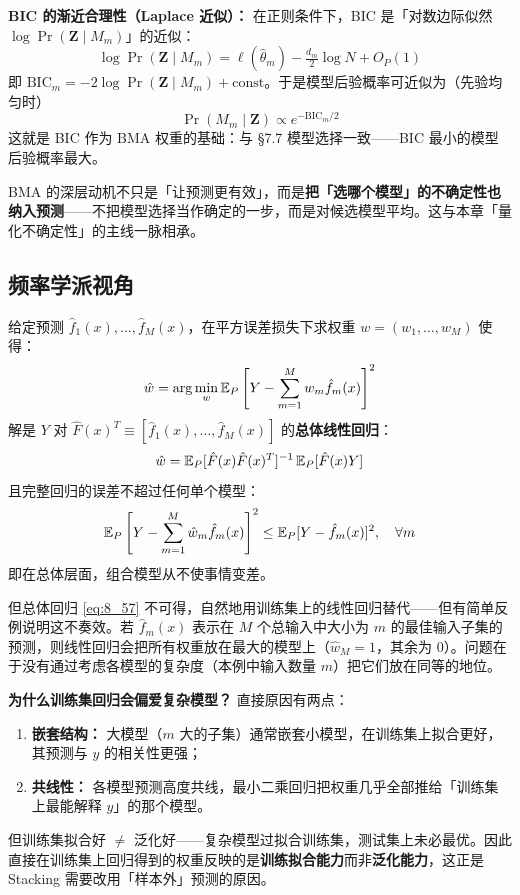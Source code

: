 \textbf{BIC 的渐近合理性（Laplace 近似）：} 在正则条件下，BIC 是「对数边际似然 $\log\Pr(\mathbf{Z}\mid M_m)$」的近似：
\[
    \log\Pr(\mathbf{Z}\mid M_m) = \ell(\hat{\theta}_m) - \tfrac{d_m}{2}\log N + O_P(1)
\]
即 $\mathrm{BIC}_m = -2\log\Pr(\mathbf{Z}\mid M_m) + \text{const}$。于是模型后验概率可近似为（先验均匀时）
\[
    \Pr(M_m\mid\mathbf{Z}) \propto e^{-\mathrm{BIC}_m/2}
\]
这就是 BIC 作为 BMA 权重的基础：与 §7.7 模型选择一致——BIC 最小的模型后验概率最大。

\begin{remark}
    BMA 的深层动机不只是「让预测更有效」，而是\textbf{把「选哪个模型」的不确定性也纳入预测}——不把模型选择当作确定的一步，而是对候选模型平均。这与本章「量化不确定性」的主线一脉相承。
\end{remark}

\subsection{频率学派视角}

给定预测 $\hat{f}_1(x), \ldots, \hat{f}_M(x)$，在平方误差损失下求权重 $w = (w_1, \ldots, w_M)$ 使得：
\begin{equation}\label{eq:8_56}
    \hat{w} = \arg\min_w \mathbb{E}_P\left[Y - \sum_{m=1}^{M} w_m \hat{f}_m(x)\right]^2
\end{equation}
解是 $Y$ 对 $\hat{F}(x)^T \equiv [\hat{f}_1(x), \ldots, \hat{f}_M(x)]$ 的\textbf{总体线性回归}：
\begin{equation}\label{eq:8_57}
    \hat{w} = \mathbb{E}_P[\hat{F}(x)\hat{F}(x)^T]^{-1}\,\mathbb{E}_P[\hat{F}(x)Y]
\end{equation}
且完整回归的误差不超过任何单个模型：
\begin{equation}\label{eq:8_58}
    \mathbb{E}_P\left[Y - \sum_{m=1}^{M}\hat{w}_m \hat{f}_m(x)\right]^2 \leq \mathbb{E}_P[Y - \hat{f}_m(x)]^2,\quad \forall m
\end{equation}
即在总体层面，组合模型从不使事情变差。

但总体回归 \eqref{eq:8_57} 不可得，自然地用训练集上的线性回归替代——但有简单反例说明这不奏效。若 $\hat{f}_m(x)$ 表示在 $M$ 个总输入中大小为 $m$ 的最佳输入子集的预测，则线性回归会把所有权重放在最大的模型上（$\hat{w}_M = 1$，其余为 0）。问题在于没有通过考虑各模型的复杂度（本例中输入数量 $m$）把它们放在同等的地位。

\textbf{为什么训练集回归会偏爱复杂模型？} 直接原因有两点：
\begin{enumerate}
    \item \textbf{嵌套结构：} 大模型（$m$ 大的子集）通常嵌套小模型，在训练集上拟合更好，其预测与 $y$ 的相关性更强；
    \item \textbf{共线性：} 各模型预测高度共线，最小二乘回归把权重几乎全部推给「训练集上最能解释 $y$」的那个模型。
\end{enumerate}
但训练集拟合好 $\ne$ 泛化好——复杂模型过拟合训练集，测试集上未必最优。因此直接在训练集上回归得到的权重反映的是\textbf{训练拟合能力}而非\textbf{泛化能力}，这正是 Stacking 需要改用「样本外」预测的原因。

